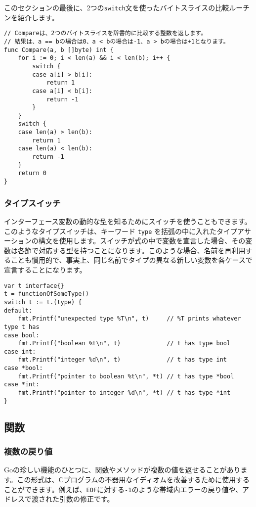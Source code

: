\documentclass{jsarticle}
\begin{document}
このセクションの最後に、2つの\texttt{switch}文を使ったバイトスライスの比較ルーチンを紹介します。

\begin{lstlisting}[numbers=none]
// Compareは、2つのバイトスライスを辞書的に比較する整数を返します。
// 結果は、a == bの場合は0、a < bの場合は-1、a > bの場合は+1となります。
func Compare(a, b []byte) int {
    for i := 0; i < len(a) && i < len(b); i++ {
        switch {
        case a[i] > b[i]:
            return 1
        case a[i] < b[i]:
            return -1
        }
    }
    switch {
    case len(a) > len(b):
        return 1
    case len(a) < len(b):
        return -1
    }
    return 0
}
\end{lstlisting}

\subsubsection{タイプスイッチ}

インターフェース変数の動的な型を知るためにスイッチを使うこともできます。このようなタイプスイッチは、キーワード
\texttt{type}
を括弧の中に入れたタイプアサーションの構文を使用します。スイッチが式の中で変数を宣言した場合、その変数は各節で対応する型を持つことになります。このような場合、名前を再利用することも慣用的で、事実上、同じ名前でタイプの異なる新しい変数を各ケースで宣言することになります。

\begin{lstlisting}[numbers=none]
var t interface{}
t = functionOfSomeType()
switch t := t.(type) {
default:
    fmt.Printf("unexpected type %T\n", t)     // %T prints whatever type t has
case bool:
    fmt.Printf("boolean %t\n", t)             // t has type bool
case int:
    fmt.Printf("integer %d\n", t)             // t has type int
case *bool:
    fmt.Printf("pointer to boolean %t\n", *t) // t has type *bool
case *int:
    fmt.Printf("pointer to integer %d\n", *t) // t has type *int
}
\end{lstlisting}

\subsection{関数}

\subsubsection{複数の戻り値}

Goの珍しい機能のひとつに、関数やメソッドが複数の値を返せることがあります。この形式は、Cプログラムの不器用なイディオムを改善するために使用することができます。例えば、\texttt{EOF}に対する\texttt{-1}のような帯域内エラーの戻り値や、アドレスで渡された引数の修正です。
\end{document}

